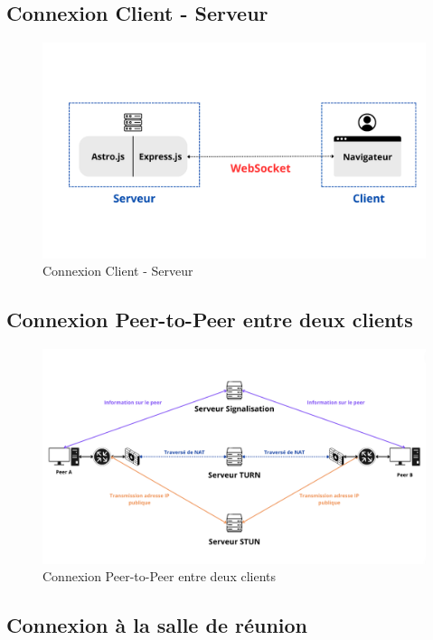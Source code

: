 \documentclass[12pt, a4paper, oneside]{thesis}
\begin{document}
\subsection{Connexion Client - Serveur}
\begin{figure}[h]
  \centering
  \includegraphics[width=1\textwidth]{images/serverclient.png}
  \caption{Connexion Client - Serveur}
\end{figure}


\subsection{Connexion Peer-to-Peer entre deux clients}
\begin{figure}[h]
  \centering
  \includegraphics[width=1\textwidth]{images/peertopeer.png}
  \caption{Connexion Peer-to-Peer entre deux clients}
\end{figure}



\subsection{Connexion à la salle de réunion}
\end{document}

